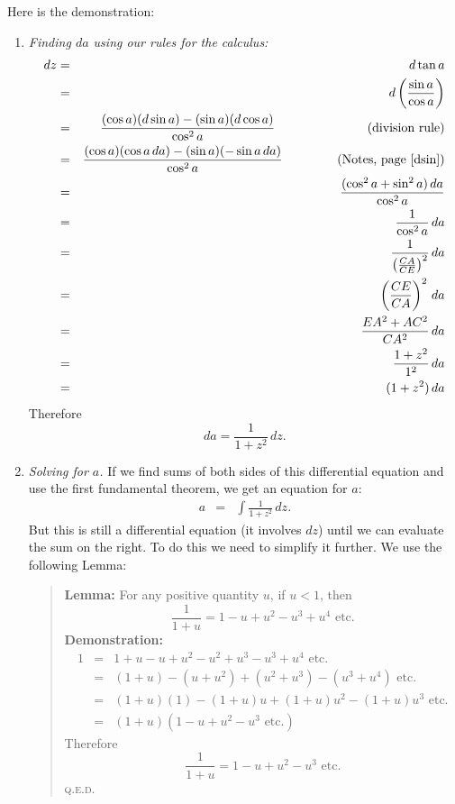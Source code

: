 \documentclass[polutonikogreek,english,twoside,openright]{article}
\begin{document}
Here is the demonstration:
\begin{enumerate}
\item {\em Finding $da$ using our rules for the calculus:}
  \setlength{\jot}{2ex}
  \begin{eqnarray*}
    dz & = & d\tan a \\
       & = & d\left(\frac{\sin a}{\cos a}\right) \\
       & = & \frac{(\cos a)(d\sin a) - (\sin a)(d\cos a)}{\cos^2 a}\mbox{\hspace{7em} (division rule)}\\
       & = & \frac{(\cos a)(\cos a\,da) - (\sin a)(-\sin
             a\,da)}{\cos^2 a}\mbox{\hspace{4em} (Notes,
             page~\pageref{dsin})}\\ 
       & = & \frac{(\cos^2 a + \sin^2 a)\,da}{\cos^2 a} \\
       & = & \frac{1}{\cos^2 a}\,da\\
       & = & \frac{1}{\left(\frac{CA}{CE}\right)^2}\,da\\
       & = & \left(\frac{CE}{CA}\right)^2\,da\\
       & = & \frac{EA^2 + AC^2}{CA^2}\,da\\
       & = & \frac{1+z^2}{1^2}\,da\\
       & = & (1+z^2)\,da
  \end{eqnarray*}
  Therefore
$$da = \frac{1}{1+z^2}\,dz.$$

\item {\em Solving for $a$.} If we find sums of both sides of this
  differential equation and use the first fundamental theorem, we get
  an equation for $a$: \setcounter{equation}{0}
  \begin{eqnarray}
    \label{ainteq} a &  = & \int\!\frac{1}{1 + z^2}\,dz.
  \end{eqnarray}
  But this is still a differential equation (it involves $dz$) until
  we can evaluate the sum on the right.  To do this we need to
  simplify it further.  We use the following Lemma:
  \begin{quote} {\bf Lemma:}\label{sumlemma} For any positive quantity
    $u$, if $u<1$, then
$$\frac{1}{1+ u} = 1 - u + u^2 - u^3 + u^4 \mbox{ etc.}$$
{\bf Demonstration:} \setlength{\jot}{1.5ex}
\begin{eqnarray*}
  1 & =  & 1 + u - u + u^2 - u^2  +u^3 - u^3 + u^4 \mbox{ etc.}\\
    & = & (1+u) - (u+ u^2) + (u^2 + u^3) - (u^3 + u^4) \mbox{ etc.}\\
    & = & (1+u)(1) - (1+u)u + (1+u)u^2 - (1+u)u^3 \mbox{ etc.}\\
    & = & (1+u)(1 - u + u^2 -u^3 \mbox{ etc.})
\end{eqnarray*}
Therefore
 $$\frac{1}{1+u} = 1 -u +u^2 - u^3 \mbox{ etc.}$$
 \textsc{q.e.d.}


\end{quote}
\end{enumerate}
\end{document}
